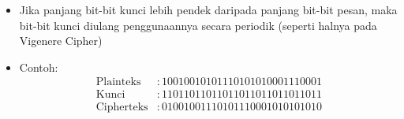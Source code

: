 \documentclass{article}
\begin{document}

\begin{itemize}
    \item Jika panjang bit-bit kunci lebih pendek daripada panjang bit-bit pesan, maka bit-bit kunci diulang penggunaannya secara periodik (seperti halnya pada Vigenere Cipher)
    \item Contoh:
    \begin{align*}
    \text{Plainteks} & : 10010010101110101010001110001 \\
    \text{Kunci} & : 11011011011011011011011011011 \\
    \text{Cipherteks} & : 01001001110101110001010101010
    \end{align*}
\end{itemize}
\end{document}
